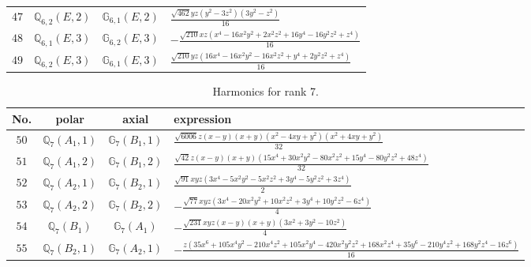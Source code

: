 \documentclass[fleqn,8pt,landscape]{jsarticle}
\begin{document}
\begin{table}[ht!]
\begin{center}
\begin{tabular}{cccl}
$ 47 $ & $ \mathbb{Q}_{6,2}(E,2) $ & $ \mathbb{G}_{6,1}(E,2) $ & $ \frac{\sqrt{462} y z \left(y^{2} - 3 z^{2}\right) \left(3 y^{2} - z^{2}\right)}{16} $ \\
$ 48 $ & $ \mathbb{Q}_{6,1}(E,3) $ & $ \mathbb{G}_{6,2}(E,3) $ & $ - \frac{\sqrt{210} x z \left(x^{4} - 16 x^{2} y^{2} + 2 x^{2} z^{2} + 16 y^{4} - 16 y^{2} z^{2} + z^{4}\right)}{16} $ \\
$ 49 $ & $ \mathbb{Q}_{6,2}(E,3) $ & $ \mathbb{G}_{6,1}(E,3) $ & $ \frac{\sqrt{210} y z \left(16 x^{4} - 16 x^{2} y^{2} - 16 x^{2} z^{2} + y^{4} + 2 y^{2} z^{2} + z^{4}\right)}{16} $ \\
 \hline \hline
\end{tabular}
\end{center}
\end{table}
\begin{table}[ht!]
\begin{center}
\caption{Harmonics for rank 7.}
\renewcommand{\arraystretch}{1.3}
\begin{tabular}{cccl} \hline \hline
No. & polar & axial & expression \\ \hline
$ 50 $ & $ \mathbb{Q}_{7}(A_{1},1) $ & $ \mathbb{G}_{7}(B_{1},1) $ & $ \frac{\sqrt{6006} z \left(x - y\right) \left(x + y\right) \left(x^{2} - 4 x y + y^{2}\right) \left(x^{2} + 4 x y + y^{2}\right)}{32} $ \\
$ 51 $ & $ \mathbb{Q}_{7}(A_{1},2) $ & $ \mathbb{G}_{7}(B_{1},2) $ & $ \frac{\sqrt{42} z \left(x - y\right) \left(x + y\right) \left(15 x^{4} + 30 x^{2} y^{2} - 80 x^{2} z^{2} + 15 y^{4} - 80 y^{2} z^{2} + 48 z^{4}\right)}{32} $ \\
$ 52 $ & $ \mathbb{Q}_{7}(A_{2},1) $ & $ \mathbb{G}_{7}(B_{2},1) $ & $ \frac{\sqrt{91} x y z \left(3 x^{4} - 5 x^{2} y^{2} - 5 x^{2} z^{2} + 3 y^{4} - 5 y^{2} z^{2} + 3 z^{4}\right)}{2} $ \\
$ 53 $ & $ \mathbb{Q}_{7}(A_{2},2) $ & $ \mathbb{G}_{7}(B_{2},2) $ & $ - \frac{\sqrt{77} x y z \left(3 x^{4} - 20 x^{2} y^{2} + 10 x^{2} z^{2} + 3 y^{4} + 10 y^{2} z^{2} - 6 z^{4}\right)}{4} $ \\
$ 54 $ & $ \mathbb{Q}_{7}(B_{1}) $ & $ \mathbb{G}_{7}(A_{1}) $ & $ - \frac{\sqrt{231} x y z \left(x - y\right) \left(x + y\right) \left(3 x^{2} + 3 y^{2} - 10 z^{2}\right)}{4} $ \\
$ 55 $ & $ \mathbb{Q}_{7}(B_{2},1) $ & $ \mathbb{G}_{7}(A_{2},1) $ & $ - \frac{z \left(35 x^{6} + 105 x^{4} y^{2} - 210 x^{4} z^{2} + 105 x^{2} y^{4} - 420 x^{2} y^{2} z^{2} + 168 x^{2} z^{4} + 35 y^{6} - 210 y^{4} z^{2} + 168 y^{2} z^{4} - 16 z^{6}\right)}{16} $ \\

\end{tabular}
\end{center}
\end{table}
\end{document}
